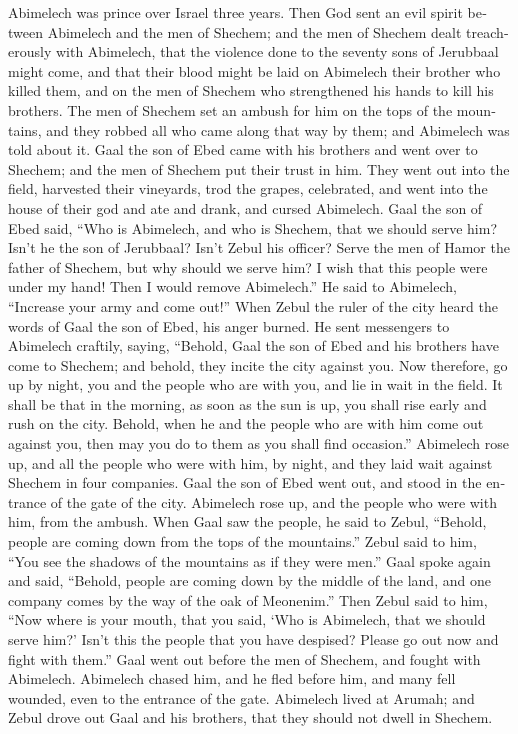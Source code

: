 \begin{paracol}{2}
\begin{otherlanguage}{english}
 Abimelech was prince over Israel three years.
 Then God sent an evil spirit between Abimelech and the
men of Shechem; and the men of Shechem dealt treacherously with
Abimelech,  that the violence done to the seventy sons of
Jerubbaal might come, and that their blood might be laid on Abimelech
their brother who killed them, and on the men of Shechem who
strengthened his hands to kill his brothers.  The men of
Shechem set an ambush for him on the tops of the mountains, and they
robbed all who came along that way by them; and Abimelech was told about
it.  Gaal the son of Ebed came with his brothers and went
over to Shechem; and the men of Shechem put their trust in him.
 They went out into the field, harvested their vineyards,
trod the grapes, celebrated, and went into the house of their god and
ate and drank, and cursed Abimelech.  Gaal the son of
Ebed said, ``Who is Abimelech, and who is Shechem, that we should serve
him? Isn't he the son of Jerubbaal? Isn't Zebul his officer? Serve the
men of Hamor the father of Shechem, but why should we serve him?
 I wish that this people were under my hand! Then I would
remove Abimelech.'' He said to Abimelech, ``Increase your army and come
out!''  When Zebul the ruler of the city heard the words
of Gaal the son of Ebed, his anger burned.  He sent
messengers to Abimelech craftily, saying, ``Behold, Gaal the son of Ebed
and his brothers have come to Shechem; and behold, they incite the city
against you.  Now therefore, go up by night, you and the
people who are with you, and lie in wait in the field. 
It shall be that in the morning, as soon as the sun is up, you shall
rise early and rush on the city. Behold, when he and the people who are
with him come out against you, then may you do to them as you shall find
occasion.''  Abimelech rose up, and all the people who
were with him, by night, and they laid wait against Shechem in four
companies.  Gaal the son of Ebed went out, and stood in
the entrance of the gate of the city. Abimelech rose up, and the people
who were with him, from the ambush.  When Gaal saw the
people, he said to Zebul, ``Behold, people are coming down from the tops
of the mountains.'' Zebul said to him, ``You see the shadows of the
mountains as if they were men.''  Gaal spoke again and
said, ``Behold, people are coming down by the middle of the land, and
one company comes by the way of the oak of Meonenim.'' 
Then Zebul said to him, ``Now where is your mouth, that you said, `Who
is Abimelech, that we should serve him?' Isn't this the people that you
have despised? Please go out now and fight with them.'' 
Gaal went out before the men of Shechem, and fought with Abimelech.
 Abimelech chased him, and he fled before him, and many
fell wounded, even to the entrance of the gate. 
Abimelech lived at Arumah; and Zebul drove out Gaal and his brothers,
that they should not dwell in Shechem.


\end{otherlanguage}
\end{paracol}
